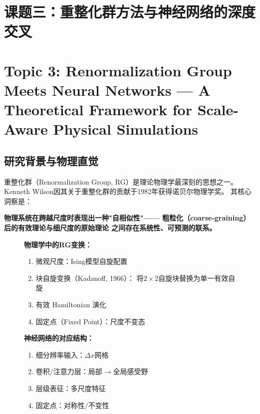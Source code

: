 \documentclass[12pt,a4paper,twoside]{article}
\begin{document}
\begin{inversation}
\clearpage

\section{课题三：重整化群方法与神经网络的深度交叉}
\section*{Topic 3: Renormalization Group Meets Neural Networks — A Theoretical Framework for Scale-Aware Physical Simulations}
\label{sec:topic3}

\subsection{研究背景与物理直觉}

重整化群（Renormalization Group, RG）是理论物理学最深刻的思想之一。
Kenneth Wilson因其关于重整化群的贡献于1982年获得诺贝尔物理学奖。
其核心洞察是：

\textbf{物理系统在跨越尺度时表现出一种"自相似性"——
粗粒化（coarse-graining）后的有效理论与细尺度的原始理论
之间存在系统性、可预测的联系。}

\begin{figure}[h]
    \centering
    \begin{minipage}{0.45\textwidth}
        \centering
        \textbf{物理学中的RG变换：}
        \begin{enumerate}
            \item 微观尺度：Ising模型自旋配置
            \item 块自旋变换（Kadanoff, 1966）：
                  将$2\times2$自旋块替换为单一有效自旋
            \item 有效 Hamiltonian 演化
            \item 固定点（Fixed Point）：尺度不变态
        \end{enumerate}
    \end{minipage}
    \hfill
    \begin{minipage}{0.45\textwidth}
        \centering
        \textbf{神经网络的对应结构：}
        \begin{enumerate}
            \item 细分辨率输入：$\Delta x$网格
            \item 卷积/注意力层：局部$\to$全局感受野
            \item 层级表征：多尺度特征
            \item 固定点：对称性/不变性
        \end{enumerate}
    \end{minipage}
\end{figure}


\end{inversation}
\end{document}
